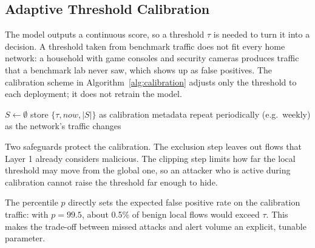 \subsection{Adaptive Threshold Calibration}\label{sec:5.5.2}
\label{sec:calibration}
\noindent The model outputs a continuous score, so a threshold $\tau$ is needed to turn it into a decision. A threshold taken from benchmark traffic does not fit every home network: a household with game consoles and security cameras produces traffic that a benchmark lab never saw, which shows up as false positives. The calibration scheme in Algorithm~\ref{alg:calibration} adjusts only the threshold to each deployment; it does not retrain the model.

\begin{algorithm}[H]
\caption{Per-network threshold calibration}
\label{alg:calibration}
$S \leftarrow \emptyset$\;
store $\{\tau, now, |S|\}$ as calibration metadata\;
repeat periodically (e.g.\ weekly) as the network's traffic changes\;
\end{algorithm}

\noindent Two safeguards protect the calibration. The exclusion step leaves out flows that Layer 1 already considers malicious. The clipping step limits how far the local threshold may move from the global one, so an attacker who is active during calibration cannot raise the threshold far enough to hide.

\noindent The percentile $p$ directly sets the expected false positive rate on the calibration traffic: with $p = 99.5$, about 0.5\% of benign local flows would exceed $\tau$. This makes the trade-off between missed attacks and alert volume an explicit, tunable parameter.

